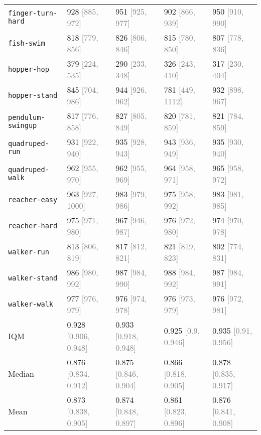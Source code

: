 \begin{table}[h]
{\begin{tabular}{lllll}
\texttt{finger-turn-hard} & 928 \textcolor{gray}{[885, 972]} & 951 \textcolor{gray}{[925, 977]} & 902 \textcolor{gray}{[866, 939]} & 950 \textcolor{gray}{[910, 990]} \\
\texttt{fish-swim} & 818 \textcolor{gray}{[779, 856]} & 826 \textcolor{gray}{[806, 846]} & 815 \textcolor{gray}{[780, 850]} & 807 \textcolor{gray}{[778, 836]} \\
\texttt{hopper-hop} & 379 \textcolor{gray}{[224, 535]} & 290 \textcolor{gray}{[233, 348]} & 326 \textcolor{gray}{[243, 410]} & 317 \textcolor{gray}{[230, 404]} \\
\texttt{hopper-stand} & 845 \textcolor{gray}{[704, 986]} & 944 \textcolor{gray}{[926, 962]} & 781 \textcolor{gray}{[449, 1112]} & 932 \textcolor{gray}{[898, 967]} \\
\texttt{pendulum-swingup} & 817 \textcolor{gray}{[776, 858]} & 827 \textcolor{gray}{[805, 849]} & 820 \textcolor{gray}{[781, 859]} & 821 \textcolor{gray}{[784, 859]} \\
\texttt{quadruped-run} & 931 \textcolor{gray}{[922, 940]} & 935 \textcolor{gray}{[928, 943]} & 943 \textcolor{gray}{[936, 949]} & 935 \textcolor{gray}{[930, 940]} \\
\texttt{quadruped-walk} & 962 \textcolor{gray}{[955, 970]} & 962 \textcolor{gray}{[955, 969]} & 964 \textcolor{gray}{[958, 971]} & 965 \textcolor{gray}{[958, 972]} \\
\texttt{reacher-easy} & 963 \textcolor{gray}{[927, 1000]} & 983 \textcolor{gray}{[979, 986]} & 975 \textcolor{gray}{[958, 992]} & 983 \textcolor{gray}{[981, 985]} \\
\texttt{reacher-hard} & 975 \textcolor{gray}{[971, 980]} & 967 \textcolor{gray}{[946, 987]} & 976 \textcolor{gray}{[972, 980]} & 974 \textcolor{gray}{[970, 978]} \\
\texttt{walker-run} & 813 \textcolor{gray}{[806, 819]} & 817 \textcolor{gray}{[812, 821]} & 821 \textcolor{gray}{[819, 823]} & 802 \textcolor{gray}{[774, 831]} \\
\texttt{walker-stand} & 986 \textcolor{gray}{[980, 992]} & 987 \textcolor{gray}{[984, 990]} & 988 \textcolor{gray}{[984, 992]} & 987 \textcolor{gray}{[984, 991]} \\
\texttt{walker-walk} & 977 \textcolor{gray}{[976, 979]} & 976 \textcolor{gray}{[974, 978]} & 976 \textcolor{gray}{[973, 979]} & 976 \textcolor{gray}{[972, 981]} \\ \midrule
IQM & 0.928 \textcolor{gray}{[0.906, 0.948]} & 0.933 \textcolor{gray}{[0.918, 0.948]} & 0.925 \textcolor{gray}{[0.9, 0.946]} & 0.935 \textcolor{gray}{[0.91, 0.956]} \\
Median & 0.876 \textcolor{gray}{[0.834, 0.912]} & 0.875 \textcolor{gray}{[0.846, 0.904]} & 0.866 \textcolor{gray}{[0.818, 0.905]} & 0.878 \textcolor{gray}{[0.835, 0.917]} \\
Mean & 0.873 \textcolor{gray}{[0.838, 0.905]} & 0.874 \textcolor{gray}{[0.848, 0.897]} & 0.861 \textcolor{gray}{[0.823, 0.896]} & 0.876 \textcolor{gray}{[0.841, 0.908]} \\
\bottomrule
\end{tabular}
}
\end{table}